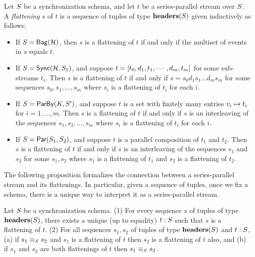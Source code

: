 \begin{definition}[Flattening]
    \label{def:sps-flattening}
    Let $\ss$ be a synchronization schema,
    and let $t$ be a series-parallel stream over $\ss$.
    A \emph{flattening} $s$ of $t$ is a sequence of tuples of type $\headers(\ss)$
    given inductively as follows:
\begin{itemize}
\item If $\ss = \relleaf{\mathcal{H}}$, then $s$ is a flattening of $t$ if and only if the multiset of events in $s$ equals $t$.
\item If $\ss = \hier{\mathcal{H}}{\ss_1}$, and suppose $t = \spsseq{t_0, d_1, t_1, \cdots, d_m, t_m}$ for some sub-streams
$t_i$.
Then $s$ is a flattening of $t$ if and only if $s = s_0 d_1 s_1 \ldots d_m s_m$ for some sequences $s_0, s_1, \ldots, s_m$ where $s_i$ is a flattening of $t_i$ for each $i$.
\item If $\ss = \keyby{K}{\ss'}$, and suppose $t$ is a set with finitely many entries $\keyed{v_i}{t_i}$ for $i = 1, \ldots, m$.
Then $s$ is a flattening of $t$ if and only if $s$ is an interleaving of the sequences $s_1, s_2, \ldots, s_m$
where $s_i$ is a flattening of $t_i$ for each $i$.
\item If $\ss = \parcomp{\ss_1}{\ss_2}$, and suppose $t$ is a parallel composition of $t_1$ and $t_2$.
Then $s$ is a flattening of $t$ if and only if $s$ is an interleaving of the sequences $s_1$ and $s_2$ for some $s_1, s_2$ where $s_1$ is a flattening of $t_1$ and $s_2$ is a flattening of $t_2$.
\end{itemize}
\end{definition}
The following proposition formalizes the connection between a series-parallel stream and its flattenings. In particular, given a sequence of tuples, once we fix a schema, there is a
unique way to interpret it as a series-parallel stream.

\begin{proposition}
\label{prop:sps-sequence-correspondence}
Let $\ss$ be a synchronization schema.
(1) For every sequence $s$ of tuples of type $\headers(\ss)$, there exists a unique (up to equality) $t : \ss$ such that $s$ is a flattening of $t$.
(2) For all sequences $s_1, s_2$ of tuples of type $\headers(\ss)$ and $t : \ss$,
(a) if $s_1 \equiv_{\ss} s_2$ and $s_1$ is a flattening of  $t$ then $s_2$ is a flattening of $t$ also, and
(b) if $s_1$ and $s_2$ are both flattenings of $t$ then $s_1 \equiv_{\ss} s_2$.
\end{proposition}

